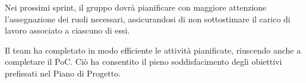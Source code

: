 Nei prossimi sprint, il gruppo dovrà pianificare con maggiore attenzione l'assegnazione dei ruoli necessari, assicurandosi di non sottostimare il carico di lavoro associato a ciascuno di essi.

Il team ha completato in modo efficiente le attività pianificate, riuscendo anche a completare il PoC. Ciò ha consentito il pieno soddisfacimento degli obiettivi prefissati nel Piano di Progetto.